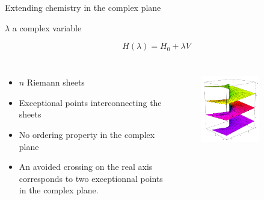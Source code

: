 \documentclass[xcolor=x11names,compress]{beamer}
\renewcommand{\(}{\begin{columns}}
\renewcommand{\)}{\end{columns}}
\newcommand{\<}[1]{\begin{column}{#1}}
\renewcommand{\>}{\end{column}}
\begin{document}
\begin{frame}{Extending chemistry in the complex plane}

\begin{beamerboxesrounded}[scheme=foncé]{\centering $\lambda$ a complex variable}

\begin{equation*}
   H(\lambda) = H_0 + \lambda V
\end{equation*}

\end{beamerboxesrounded}

\begin{columns}


\begin{itemize}
    \item $n$ Riemann sheets
    \vspace{0.3cm}
    \item Exceptional points interconnecting the sheets
    \vspace{0.3cm}
    \item No ordering property in the complex plane
    \vspace{0.3cm}
    \item An avoided crossing on the real axis corresponds to two exceptionnal points in the complex plane.
\end{itemize}


\begin{figure}
    \centering
    \includegraphics[width=0.7\textwidth]{riemannsheet.png}
    \label{fig:my_label}
\end{figure}

\end{columns}

\end{frame}
\end{document}
